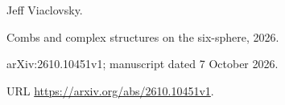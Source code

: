 Jeff Viaclovsky.

\newblock Combs and complex structures on the six-sphere, 2026{}.

\newblock arXiv:2610.10451v1; manuscript dated 7 October 2026.

\newblock URL \url{https://arxiv.org/abs/2610.10451v1}.

